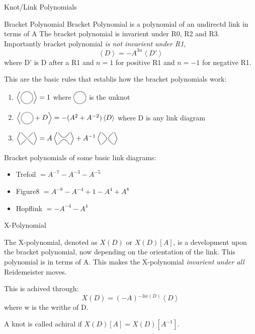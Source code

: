\documentclass[12pt, letterpaper]{article}
\newcommand{\KP}[1]{%
  \begin{tikzpicture}[baseline=-\dimexpr\fontdimen22\textfont2\relax]
  #1
  \end{tikzpicture}%
}
\newcommand{\Circle}{%
  \KP{\filldraw[color=gray, fill=none, thick] circle (0.3);}%
}
\newcommand{\UCross}{%
  \KP{
    \draw[color=gray,thick] (-0.3,0.3) -- (0.3,-0.3);
    \draw[color=gray,thick] (-0.3,-0.3) -- (-0.05,-0.05);
    \draw[color=gray,thick] (0.05,0.05) -- (0.3,0.3);
  }%
}
\newcommand{\RSmooth}{%
  \KP{%
    \draw[color=gray,thick] (-0.3,0.3)..controls (0,-0.05).. (0.3,0.3);
    \draw[color=gray,thick] (-0.3,-0.3)..controls (0,0.05).. (0.3,-0.3);
  }%
}
\newcommand{\LSmooth}{%
  \KP{%
    \draw[color=gray,thick] (-0.3,-0.3)..controls (0.05,0).. (-0.3,0.3);
    \draw[color=gray,thick] (0.3,-0.3)..controls (-0.05,0).. (0.3,0.3);
  }%
}
\begin{document}
\begin{section}{Knot/Link Polynomials}

  \begin{subsection}{Bracket Polynomial}
    Bracket Polynomial is a polynomial of an undirectd link in terms of A
    The bracket polynomial is invarient under R0, R2 and R3.
    Importantly bracket polynomial \emph{is not invarient under R1},
    \[\left\langle D \right\rangle = -A^{3n} \left\langle D' \right\rangle\]
    where D' is D after a R1 and \(n=1\) for positive R1 and \(n=-1\) for
    negative R1.

    This are the basic rules that establis how the bracket polynomials work:
    \begin{enumerate}
      \item \(\left\langle \Circle \right\rangle = 1\) where \(\Circle\) is the
            unknot
      \item \(\left\langle \Circle + D \right\rangle =- (A^{2} + A^{-2}) \left\langle D\right\rangle\)
            where D is any link diagram
      \item
            \(\left\langle \UCross \right\rangle = A \left\langle \RSmooth \right\rangle + A^{-1} \left\langle \LSmooth \right\rangle\)
    \end{enumerate}

    Bracket polynomials of some basic link diagrams:
    \begin{itemize}
      \item Trefoil \(= A^{-7} - A^{-3} - A^{-5}\)
      \item Figure8 \(= A^{-8} - A^{-4} + 1 - A^{4} + A^{8}\)
      \item Hopflink \(= -A^{-4} - A^{4}\)
    \end{itemize}
  \end{subsection}

  \begin{subsection}{X-Polynomial}
    
    The X-polynomial, denoted as \(X(D)\) or \(X(D)[A]\),
    is a development upon the bracket polynomial, now depending on the
    orientation of the link.
    This polynomial is in terms of A.
    This makes the X-polynomial \emph{invarient under all} Reidemeister moves.

    This is achived through: \[X(D) = (-A){}^{-3w(D)} \left\langle D \right\rangle\]
    where w is the writhe of D.

    A knot is called achiral if \(X(D)[A] = X(D)[A^{-1}]\).
  \end{subsection}


\end{section}
\end{document}
